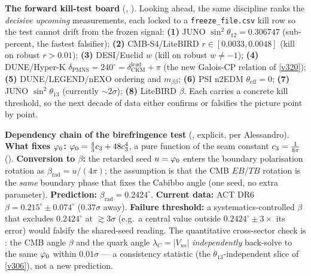 \par\smallskip\noindent\textbf{The forward kill-test board} (\mE, ). Looking ahead,
the same discipline ranks the \emph{decisive upcoming} measurements, each locked to a \texttt{freeze\_file.csv} kill
row so the test cannot drift from the frozen signal: \textbf{(1)} JUNO $\sin^2\theta_{12}=0.306747$ (sub-percent, the
fastest falsifier); \textbf{(2)} CMB-S4/LiteBIRD $r\in[0.0033,0.0048]$ (kill on robust $r>0.01$); \textbf{(3)}
DESI/Euclid $w$ (kill on robust $w\ne-1$); \textbf{(4)} DUNE/Hyper-K $\delta_{\mathrm{PMNS}}=240^\circ=
\delta_{\mathrm{CKM}}^{\mathrm{lead}}+\pi$ (the new Galois-CP relation of \vref{v320}); \textbf{(5)} DUNE/LEGEND/nEXO
ordering and $m_{\beta\beta}$; \textbf{(6)} PSI n2EDM $\theta_{\mathrm{eff}}=0$; \textbf{(7)} JUNO $\sin^2\theta_{13}$
(currently $\sim2\sigma$); \textbf{(8)} LiteBIRD $\beta$. Each carries a concrete kill threshold, so the next decade
of data either confirms or falsifies the picture point by point.

\par\smallskip\noindent\textbf{Dependency chain of the birefringence test} (\fobs, explicit, per Alessandro).
\textbf{What fixes $\varphi_0$:} $\varphi_0=\tfrac43c_3+48c_3^4$, a pure function of the seam constant
$c_3=\tfrac1{8\pi}$ (\mE). \textbf{Conversion to $\beta$:} the retarded seed $u=\varphi_0$ enters the
boundary polarisation rotation as $\beta_{\mathrm{rad}}=u/(4\pi)$; the assumption is that the CMB
$EB$/$TB$ rotation is the \emph{same} boundary phase that fixes the Cabibbo angle (one seed, no extra
parameter). \textbf{Prediction:} $\beta_{\mathrm{rad}}=0.2424^\circ$. \textbf{Current data:} ACT DR6
$\beta=0.215^\circ\pm0.074^\circ$ ($0.37\sigma$ away). \textbf{Failure threshold:} a systematics-controlled
$\beta$ that excludes $0.2424^\circ$ at $\gtrsim3\sigma$ (e.g.\ a central value outside
$0.2424^\circ\pm3\times$ its error) would falsify the shared-seed reading. 
The quantitative cross-sector check is : the CMB angle $\beta$ and the quark angle $\lambda_C{=}|V_{us}|$ \emph{independently} back-solve to the same $\varphi_0$ within $0.01\sigma$ --- a consistency statistic (the $\theta_{13}$-independent slice of \vref{v306}), not a new prediction.


